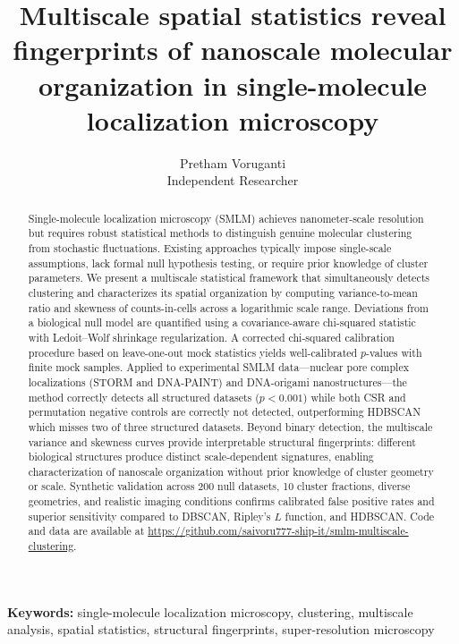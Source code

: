 \documentclass[11pt]{article}
\title{Multiscale spatial statistics reveal fingerprints of nanoscale
       molecular organization in single-molecule localization microscopy}
\author{%
  Pretham Voruganti\\[6pt]
  \small Independent Researcher
}
\date{}
\begin{document}
\maketitle

\begin{abstract}
Single-molecule localization microscopy (SMLM) achieves nanometer-scale
resolution but requires robust statistical methods to distinguish genuine
molecular clustering from stochastic fluctuations. Existing approaches
typically impose single-scale assumptions, lack formal null hypothesis
testing, or require prior knowledge of cluster parameters. We present a
multiscale statistical framework that simultaneously detects clustering
and characterizes its spatial organization by computing variance-to-mean
ratio and skewness of counts-in-cells across a logarithmic scale range.
Deviations from a biological null model are quantified using a
covariance-aware chi-squared statistic with Ledoit--Wolf shrinkage
regularization. A corrected chi-squared calibration procedure based on
leave-one-out mock statistics yields well-calibrated $p$-values with
finite mock samples. Applied to experimental SMLM data---nuclear pore
complex localizations (STORM and DNA-PAINT) and DNA-origami
nanostructures---the method correctly detects all structured datasets
($p < 0.001$) while both CSR and permutation negative controls are
correctly not detected, outperforming HDBSCAN which misses two of three
structured datasets. Beyond binary detection, the multiscale variance
and skewness curves provide interpretable structural fingerprints:
different biological structures produce distinct scale-dependent
signatures, enabling characterization of nanoscale organization without
prior knowledge of cluster geometry or scale. Synthetic validation across
200 null datasets, 10 cluster fractions, diverse geometries, and
realistic imaging conditions confirms calibrated false positive rates and
superior sensitivity compared to DBSCAN, Ripley's $L$ function, and
HDBSCAN. Code and data are available at
\url{https://github.com/saivoru777-ship-it/smlm-multiscale-clustering}.
\end{abstract}

\textbf{Keywords:} single-molecule localization microscopy, clustering,
multiscale analysis, spatial statistics, structural fingerprints,
super-resolution microscopy

\end{document}
